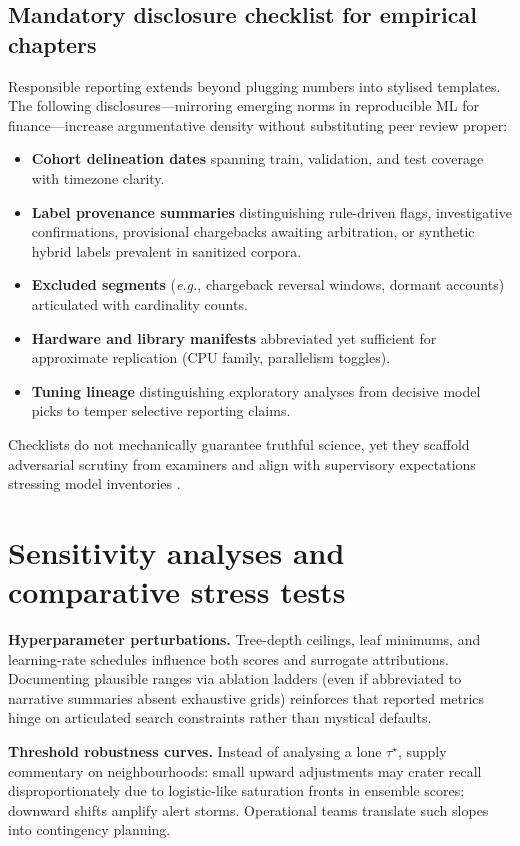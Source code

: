 \subsection{Mandatory disclosure checklist for empirical chapters}
Responsible reporting extends beyond plugging numbers into stylised templates. The following disclosures—mirroring emerging norms in reproducible ML for finance—increase argumentative density without substituting peer review proper:
\begin{itemize}
    \item \textbf{Cohort delineation dates} spanning train, validation, and test coverage with timezone clarity.
    \item \textbf{Label provenance summaries} distinguishing rule-driven flags, investigative confirmations, provisional chargebacks awaiting arbitration, or synthetic hybrid labels prevalent in sanitized corpora.
    \item \textbf{Excluded segments} (\emph{e.g.}, chargeback reversal windows, dormant accounts) articulated with cardinality counts.
    \item \textbf{Hardware and library manifests} abbreviated yet sufficient for approximate replication (CPU family, parallelism toggles).
    \item \textbf{Tuning lineage} distinguishing exploratory analyses from decisive model picks to temper selective reporting claims.
\end{itemize}
Checklists do not mechanically guarantee truthful science, yet they scaffold adversarial scrutiny from examiners and align with supervisory expectations stressing model inventories \cite{fraud_handbook}.

\section{Sensitivity analyses and comparative stress tests}
\textbf{Hyperparameter perturbations.} Tree-depth ceilings, leaf minimums, and learning-rate schedules influence both scores and surrogate attributions. Documenting plausible ranges via ablation ladders (even if abbreviated to narrative summaries absent exhaustive grids) reinforces that reported metrics hinge on articulated search constraints rather than mystical defaults.

\textbf{Threshold robustness curves.} Instead of analysing a lone $\tau^\star$, supply commentary on neighbourhoods: small upward adjustments may crater recall disproportionately due to logistic-like saturation fronts in ensemble scores; downward shifts amplify alert storms. Operational teams translate such slopes into contingency planning.

